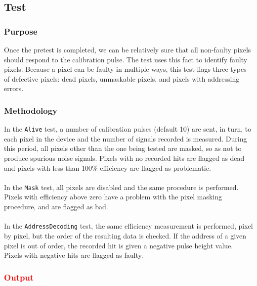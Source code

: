 
\newpage

\subsection{\alivetest Test}
\label{ss:alive}

\subsubsection{Purpose}

Once the pretest is completed, we can be relatively sure that all non-faulty pixels should respond to the calibration pulse.
The \alivetest test uses this fact to identify faulty pixels.
Because a pixel can be faulty in multiple ways, this test flags three types of defective pixels:
dead pixels, unmaskable pixels, and pixels with addressing errors.

\subsubsection{Methodology}

In the {\tt Alive} test, a number of calibration pulses (default 10) are sent, in turn,
to each pixel in the device and the number of signals recorded is measured.
During this period, all pixels other than the one being tested are masked, so as not to produce spurious noise signals.
Pixels with no recorded hits are flagged as dead and pixels with less than 100\% efficiency are flagged as problematic.
\\\\
In the {\tt Mask} test, all pixels are disabled and the same procedure is performed.
Pixels with efficiency above zero have a problem with the pixel masking procedure, and are flagged as bad.
\\\\
In the {\tt AddressDecoding} test, the same efficiency measurement is performed, pixel by pixel,
but the order of the resulting data is checked.
If the address of a given pixel is out of order, the recorded hit is given a negative pulse height value.
Pixels with negative hits are flagged as faulty.

\subsubsection{\textcolor{red}{Output}}
